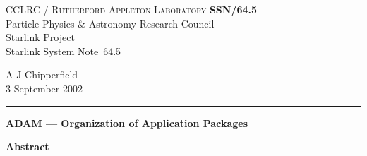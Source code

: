 \documentclass[twoside,11pt]{article}
\newcommand{\stardoccategory}  {Starlink System Note}
\newcommand{\stardocinitials}  {SSN}
\newcommand{\stardocnumber}    {64.5}
\newcommand{\stardocauthors}   {A J Chipperfield}
\newcommand{\stardocdate}      {3 September 2002}
\newcommand{\stardoctitle}     {ADAM --- Organization of Application Packages}
\newcommand{\stardocname}{\stardocinitials /\stardocnumber}
\newenvironment{latexonly}{}{}
\renewcommand{\_}{\texttt{\symbol{95}}}
\begin{document}
\thispagestyle{empty}

\begin{latexonly}
   CCLRC / \textsc{Rutherford Appleton Laboratory} \hfill \textbf{\stardocname}\\
   {\large Particle Physics \& Astronomy Research Council}\\
   {\large Starlink Project\\}
   {\large \stardoccategory\ \stardocnumber}
   \begin{flushright}
   \stardocauthors\\
   \stardocdate
   \end{flushright}
   \vspace{-4mm}
   \rule{\textwidth}{0.5mm}
   \vspace{5mm}
   \begin{center}
   {\Large\textbf{\stardoctitle}}
   \end{center}
   \vspace{5mm}

   \vspace{10mm}
   \begin{center}
      {\Large\textbf{Abstract}}
   \end{center}
\end{latexonly}
\end{document}
